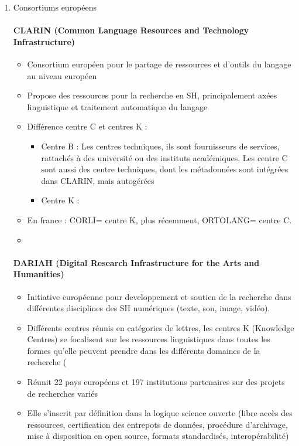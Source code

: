 \documentclass{book}
\newenvironment{titlemize}[1]{%
  \paragraph{#1}
  \begin{itemize}}
  {\end{itemize}}
\begin{document}
\begin{enumerate}
    \begin{comment}
    \item Consortium purement pluridiciplinaires 
        \begin{titlemize}{Projets Time Machine}
            \item Les actions du Consortium Huma-Num PTM ou Projets Time Machine s’articulent autour de la notion de référentiel géohistorique et des données géohistoriques spatialisées.
            \item Réunit des chercheurs de différents champs disciplinaire des HN (histoire, archéologie, histoire de l’art, géographie...)
        \end{titlemize}
    \end{comment}
    \item Consortiums européens
        \begin{titlemize}{CLARIN (Common Language Resources and Technology Infrastructure)}
            \item Consortium européen pour le partage de ressources et d'outils du langage au niveau européen
            \item Propose des ressources pour la recherche en SH, principalement axées linguistique et traitement automatique du langage
            \item Différence centre C et centres K : 
            \begin{itemize}
                \item Centre B : Les centres techniques, ils sont fournisseurs de services, rattachés à des université ou des instituts académiques. Les centre C sont aussi des centre techniques, dont les métadonnées sont intégrées dans CLARIN, mais autogérées%
                \item Centre K : 
            \end{itemize}
            \item En france : CORLI= centre K, plus récemment, ORTOLANG= centre C.
            \item 
        \end{titlemize}
        \begin{titlemize}{DARIAH (Digital Research Infrastructure for the Arts and Humanities)}
            \item Initiative européenne pour developpement et soutien de la recherche dans différentes disciplines des SH numériques (texte, son, image, vidéo).
            \item Différents centres réunis en catégories de lettres, les centres K (Knowledge Centres) se focalisent sur les ressources linguistiques dans toutes les formes qu'elle peuvent prendre dans les différents domaines de la recherche (
            \item Réunit 22 pays européens et 197 institutions partenaires sur des projets de recherches variés
            \item Elle s'inscrit par définition dans la logique science ouverte (libre accès des ressources, certification des entrepots de données, procédure d'archivage, mise à disposition en open source, formats standardisés, interopérabilité)
            

\end{titlemize}
\end{enumerate}
\end{document}
